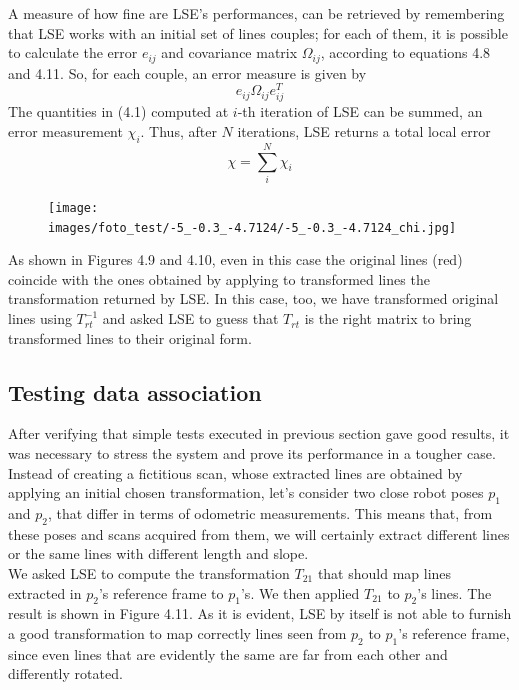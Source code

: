 \documentclass[a4paper, onecolumn]{report}
\begin{document}
A measure of how fine are LSE's performances, can be retrieved by remembering that LSE works with an initial set of lines couples; for each of them, it is possible to calculate the error $e_{ij}$ and covariance matrix $\Omega_{ij}$, according to equations 4.8 and 4.11. So, for each couple, an error measure is given by 
\begin{equation}
	e_{ij}\Omega_{ij}e_{ij}^T
\end{equation}
The quantities in (4.1) computed at $i$-th iteration of LSE can be summed, an error measurement $\chi_i$. Thus, after $N$ iterations, LSE returns a total local error
\begin{equation}
	\chi = \sum_i^N \chi_i
\end{equation}

\begin{figure}[htbp]
\centering
\texttt{[image: images/foto\_test/-5\_-0.3\_-4.7124/-5\_-0.3\_-4.7124\_chi.jpg]}
\end{figure}


As shown in Figures 4.9 and 4.10, even in this case the original lines (red) coincide with the ones obtained by applying to transformed lines the transformation returned by LSE. In this case, too, we have transformed original lines using $T_{rt}^{-1}$ and asked LSE to guess that $T_{rt}$ is the right matrix to bring transformed lines to their original form.

\subsection{Testing data association}
After verifying that simple tests executed in previous section gave good results, it was necessary to stress the system and prove its performance in a tougher case. Instead of creating a fictitious scan, whose extracted lines are obtained by applying an initial chosen transformation, let's consider two close robot poses $p_1$ and $p_2$, that differ in terms of odometric measurements. This means that, from these poses and scans acquired from them, we will certainly extract different lines or the same lines with different length and slope. \\ 
We asked LSE to compute the transformation $T_{21}$ that should map lines extracted in $p_2$'s reference frame to $p_1$'s. We then applied $T_{21}$ to $p_2$'s lines. The result is shown in Figure 4.11. As it is evident, LSE by itself is not able to furnish a good transformation to map correctly lines seen from $p_2$ to $p_1$'s reference frame, since even lines that are evidently the same are far from each other and differently rotated. 
\end{document}

